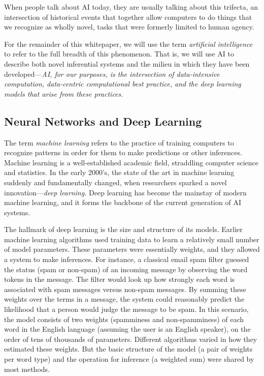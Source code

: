 \documentclass[12pt, oneside]{article}   	%
\begin{document}
When people talk about AI today, they are usually talking about this trifecta, an intersection of historical events that together allow computers to do things that we recognize as wholly novel, tasks that were formerly limited to human agency.

For the remainder of this whitepaper, we will use the term \emph{artificial intelligence} to refer to the full breadth of this phenomenon.  That is, we will use AI to describe both novel inferential systems and the milieu in which they have been developed—\emph{AI, for our purposes, is the intersection of data-intensive computation, data-centric computational best practice, and the deep learning models that arise from these practices.}


\subsection{Neural Networks and Deep Learning}\label{section.definitions.deep-learning}
The term \emph{machine learning} refers to the practice of training computers to recognize patterns in order for them to make predictions or other inferences.  Machine learning is a well-established academic field, straddling computer science and statistics.  In the early 2000’s, the state of the art in machine learning suddenly and fundamentally changed, when researchers sparked a novel innovation—\emph{deep learning.}  Deep learning has become the mainstay of modern machine learning, and it forms the backbone of the current generation of AI systems.

The hallmark of deep learning is the size and structure of its models.  Earlier machine learning algorithms used training data to learn a relatively small number of model parameters.  These parameters were essentially weights, and they allowed a system to make inferences.  For instance, a classical email spam filter guessed the status (spam or non-spam) of an incoming message by observing the word tokens in the message.  The filter would look up how strongly each word is associated with spam messages versus non-spam messages.  By summing these weights over the terms in a message, the system could reasonably predict the likelihood that a person would judge the message to be spam.  In this scenario, the model consists of two weights (spamminess and non-spamminess) of each word in the English language (assuming the user is an English speaker), on the order of tens of thousands of parameters.  Different algorithms varied in how they estimated these weights.  But the basic structure of the model (a pair of weights per word type) and the operation for inference (a weighted sum) were shared by most methods.
\end{document}
